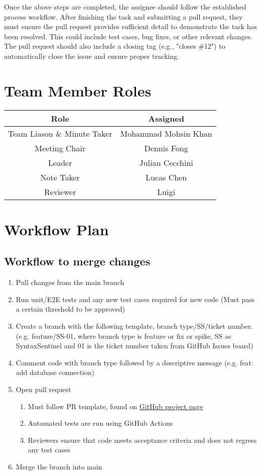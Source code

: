 \documentclass{article}
\begin{document}
Once the above steps are completed, the assignee should follow the established 
process workflow. After finishing the task and submitting a pull request, they 
must ensure the pull request provides sufficient detail to demonstrate the task 
has been resolved. This could include test cases, bug fixes, or other relevant 
changes. The pull request should also include a closing tag (e.g., "closes \#12") 
to automatically close the issue and ensure proper tracking.

\section{Team Member Roles}

\begin{tabular}{|c|c|}
\hline
\textbf{Role} & \textbf{Assigned} \\
\hline
Team Liason \& Minute Taker & Mohammad Mohsin Khan \\
\hline
Meeting Chair & Dennis Fong \\
\hline
Leader & Julian Cecchini \\
\hline
Note Taker & Lucas Chen \\
\hline
Reviewer & Luigi \\
\hline
\end{tabular}

\section{Workflow Plan}

\subsection{Workflow to merge changes}
\begin{enumerate}
    \item Pull changes from the main branch
    \item Run unit/E2E tests and any new test cases required for new code (Must pass a certain threshold to be approved)
    \item Create a branch with the following template, branch type/SS/ticket number. (e.g. feature/SS-01, where branch type is feature or fix or spike, SS as SyntaxSentinel and 01 is the ticket number taken from GitHub Issues board)
    \item Comment code with branch type followed by a descriptive message (e.g. feat: add database connection)
    \item Open pull request
        \begin{enumerate}
            \item Must follow PR template, found on \href{https://github.com/lilweege/SyntaxSentinels/blob/main/.github/pull_request_template.md}{GitHub project page}
            \item Automated tests are run using GitHub Actions
            \item Reviewers ensure that code meets acceptance criteria and does not regress any test cases
        \end{enumerate}
    \item Merge the branch into main
\end{enumerate}
\end{document}

